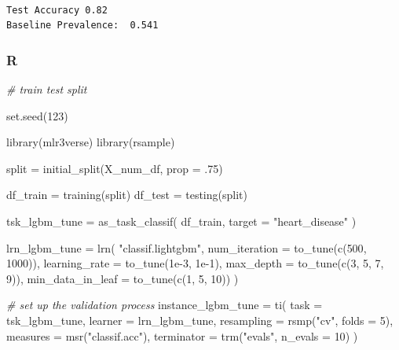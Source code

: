 \documentclass[
  letterpaper,
]{krantz}
\newenvironment{Shaded}{}{}
\newcommand{\AttributeTok}[1]{\textcolor[rgb]{0.49,0.56,0.16}{#1}}
\newcommand{\CommentTok}[1]{\textcolor[rgb]{0.38,0.63,0.69}{\textit{#1}}}
\newcommand{\DecValTok}[1]{\textcolor[rgb]{0.25,0.63,0.44}{#1}}
\newcommand{\FloatTok}[1]{\textcolor[rgb]{0.25,0.63,0.44}{#1}}
\newcommand{\FunctionTok}[1]{\textcolor[rgb]{0.02,0.16,0.49}{#1}}
\newcommand{\NormalTok}[1]{#1}
\newcommand{\OtherTok}[1]{\textcolor[rgb]{0.00,0.44,0.13}{#1}}
\newcommand{\StringTok}[1]{\textcolor[rgb]{0.25,0.44,0.63}{#1}}
\begin{document}
\begin{verbatim}

Test Accuracy 0.82 
Baseline Prevalence:  0.541
\end{verbatim}

\subsubsection{R}

\begin{Shaded}
\begin{Highlighting}[]
\CommentTok{\# train test split}

\FunctionTok{set.seed}\NormalTok{(}\DecValTok{123}\NormalTok{)}

\FunctionTok{library}\NormalTok{(mlr3verse)}
\FunctionTok{library}\NormalTok{(rsample)}

\NormalTok{split }\OtherTok{=} \FunctionTok{initial\_split}\NormalTok{(X\_num\_df, }\AttributeTok{prop =}\NormalTok{ .}\DecValTok{75}\NormalTok{)}

\NormalTok{df\_train }\OtherTok{=} \FunctionTok{training}\NormalTok{(split)}
\NormalTok{df\_test  }\OtherTok{=} \FunctionTok{testing}\NormalTok{(split)}

\NormalTok{tsk\_lgbm\_tune }\OtherTok{=} \FunctionTok{as\_task\_classif}\NormalTok{(}
\NormalTok{    df\_train,}
    \AttributeTok{target =} \StringTok{"heart\_disease"}
\NormalTok{)}

\NormalTok{lrn\_lgbm\_tune }\OtherTok{=} \FunctionTok{lrn}\NormalTok{(}
    \StringTok{"classif.lightgbm"}\NormalTok{,}
    \AttributeTok{num\_iteration =} \FunctionTok{to\_tune}\NormalTok{(}\FunctionTok{c}\NormalTok{(}\DecValTok{500}\NormalTok{, }\DecValTok{1000}\NormalTok{)),}
    \AttributeTok{learning\_rate =} \FunctionTok{to\_tune}\NormalTok{(}\FloatTok{1e{-}3}\NormalTok{, }\FloatTok{1e{-}1}\NormalTok{),}
    \AttributeTok{max\_depth =} \FunctionTok{to\_tune}\NormalTok{(}\FunctionTok{c}\NormalTok{(}\DecValTok{3}\NormalTok{, }\DecValTok{5}\NormalTok{, }\DecValTok{7}\NormalTok{, }\DecValTok{9}\NormalTok{)),}
    \AttributeTok{min\_data\_in\_leaf =} \FunctionTok{to\_tune}\NormalTok{(}\FunctionTok{c}\NormalTok{(}\DecValTok{1}\NormalTok{, }\DecValTok{5}\NormalTok{, }\DecValTok{10}\NormalTok{))}
\NormalTok{)}

\CommentTok{\# set up the validation process}
\NormalTok{instance\_lgbm\_tune }\OtherTok{=} \FunctionTok{ti}\NormalTok{(}
    \AttributeTok{task =}\NormalTok{ tsk\_lgbm\_tune,}
    \AttributeTok{learner =}\NormalTok{ lrn\_lgbm\_tune,}
    \AttributeTok{resampling =} \FunctionTok{rsmp}\NormalTok{(}\StringTok{"cv"}\NormalTok{, }\AttributeTok{folds =} \DecValTok{5}\NormalTok{),}
    \AttributeTok{measures =} \FunctionTok{msr}\NormalTok{(}\StringTok{"classif.acc"}\NormalTok{),}
    \AttributeTok{terminator =} \FunctionTok{trm}\NormalTok{(}\StringTok{"evals"}\NormalTok{, }\AttributeTok{n\_evals =} \DecValTok{10}\NormalTok{)}
\NormalTok{)}


\end{Highlighting}
\end{Shaded}
\end{document}
